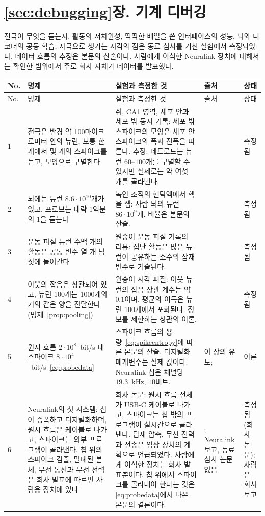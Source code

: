 \section{\ref{sec:debugging}장. 기계 디버깅}

전극이 무엇을 듣는지, 활동의 저차원성, 딱딱한 배열을 쓴 인터페이스의 성능, 뇌와 디코더의 공동 학습, 자극으로 생기는 시각의 점은 동료 심사를 거친 실험에서 측정되었다. 데이터 흐름의 추정은 본문의 산술이다. 사람에게 이식한 Neuralink 장치에 대해서는 확인한 범위에서 주로 회사 자체가 데이터를 발표했다.

{\footnotesize
\setlength{\tabcolsep}{3pt}\renewcommand{\arraystretch}{1.15}
\begin{longtable}{>{\raggedright}p{0.5cm}>{\raggedright}p{4.0cm}>{\raggedright}p{5.6cm}>{\raggedright}p{2.3cm}>{\raggedright\arraybackslash}p{1.7cm}}
\toprule
No. & 명제 & 실험과 측정한 것 & 출처 & 상태 \\
\midrule\endfirsthead
\toprule
No. & 명제 & 실험과 측정한 것 & 출처 & 상태 \\
\midrule\endhead
1 & 전극은 반경 약 100마이크로미터 안의 뉴런, 보통 한 개에서 몇 개의 스파이크를 듣고, 모양으로 구별한다 & 쥐, CA1 영역, 세포 안과 세포 밖 동시 기록: 세포 밖 스파이크의 모양은 세포 안 스파이크의 폭과 진폭을 따른다. 추정: 테트로드는 뉴런 $60$--$100$개를 구별할 수 있지만 실제로는 약 여섯 개를 골라낸다. & \cite{Henze2000extra} & 측정됨 \\
2 & 뇌에는 뉴런 $8.6\cdot10^{10}$개가 있고, 프로브는 대략 1억분의 1을 듣는다 & 녹인 조직의 현탁액에서 핵을 셈: 사람 뇌의 뉴런 $86\cdot10^9$개. 비율은 본문의 산술. & \cite{Azevedo2009} & 측정됨 \\
3 & 운동 피질 뉴런 수백 개의 활동은 공통 변수 열 개 남짓에 들어간다 & 원숭이 운동 피질 기록의 리뷰: 집단 활동은 많은 뉴런이 공유하는 소수의 잠재 변수로 기술된다. & \cite{Gallego2017} & 측정됨 \\
4 & 이웃의 잡음은 상관되어 있고, 뉴런 100개는 1000개와 거의 같은 양을 전달한다(명제~\ref{prop:pooling}) & 원숭이 시각 피질: 이웃 뉴런의 잡음 상관 계수는 약 $0.1$이며, 평균의 이득은 뉴런 100개에서 포화된다. 정보를 제한하는 상관의 이론. & \cite{Zohary1994, MorenoBote2014} & 측정됨 \\
5 & 원시 흐름 $2\cdot10^8$~bit/s 대 스파이크 $8\cdot10^4$~bit/s~\eqref{eq:probedata} & 스파이크 흐름의 용량~\eqref{eq:spikeentropy}에 따른 본문의 산술. 디지털화 매개변수는 실제 값이다: Neuralink 칩은 채널당 $19.3$~kHz, $10$비트. & 이 장의 유도; \cite{Rieke1997, Musk2019} & 이론 \\
6 & Neuralink의 첫 시스템: 칩이 증폭하고 디지털화하며, 원시 흐름은 케이블로 나가고, 스파이크는 외부 프로그램이 골라낸다. 칩 위의 스파이크 검출, 밀폐된 본체, 무선 통신과 무선 전력은 회사 발표에 따르면 사람용 장치에 있다 & 회사 논문: 원시 흐름 전체가 USB-C 케이블로 나가고, 스파이크는 칩 밖의 프로그램이 실시간으로 골라낸다. 탑재 압축, 무선 전력과 전송은 임상 장치의 계획으로 언급되었다. 사람에게 이식한 장치는 회사 발표뿐이다. 칩 위에서 스파이크를 골라내야 한다는 것은 \eqref{eq:probedata}에서 나온 본문의 결론이다. & \cite{Musk2019}; Neuralink 보고, 동료 심사 논문 없음 & 측정됨(회사 논문); 사람은 회사 보고 \\

\end{longtable}}
